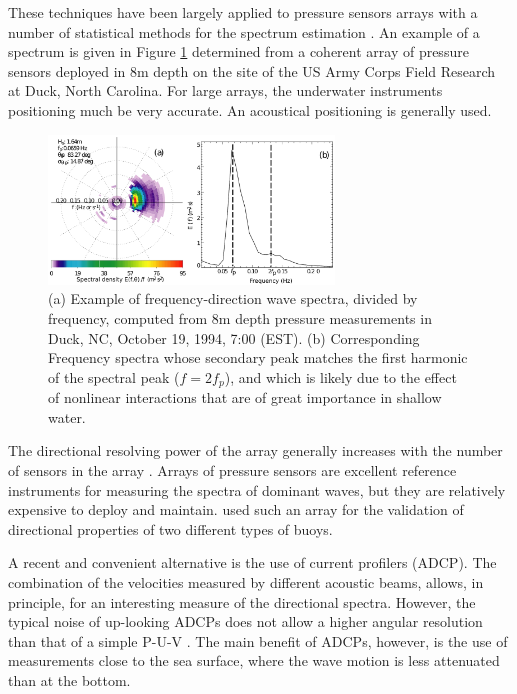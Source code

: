 These techniques have been largely applied to pressure sensors arrays with a number of statistical methods for the spectrum estimation 
 \citep[e.g.][]{Davis&Regier1977, Long&Hasselmann1979, Pawka1983, Herbers&Guza1990}. An example of a spectrum is given in Figure \ref{wave spectra} 
determined from a coherent array of pressure sensors deployed in 8m depth on the site of the US Army Corps Field Research at Duck, North Carolina. 
For large arrays, the underwater instruments positioning much be very accurate. An acoustical positioning is generally used.
\begin{figure}
\centerline{\includegraphics[width=0.6758\textwidth]{FIGS_CH_MEASUREMENTS/introduction_fig1.pdf}}
\caption{(a) Example of frequency-direction wave spectra, divided by frequency, computed from 8m depth pressure measurements in Duck, NC, October 
19, 1994, 7:00 (EST). (b) Corresponding Frequency spectra whose secondary peak matches the first harmonic of the spectral peak 
($f=2f_p$), and which is likely due to the effect of nonlinear interactions that are of great importance in shallow water.}
\label{wave spectra}
\end{figure}
  The directional resolving power of the array generally increases with the number of sensors in the array \citep[see][]{Kinsman1965}. 
  Arrays of pressure sensors are excellent reference instruments for measuring the spectra of dominant waves,  but they 
are relatively expensive to deploy and maintain. \cite{OReilly&al.1996} used such an array for the validation of directional properties of two different types of 
buoys. %

A recent and convenient alternative is the use of current profilers (ADCP).  The combination of the velocities measured by different acoustic beams, 
allows, in principle, for an interesting measure of the directional spectra. However, the typical noise of up-looking ADCPs does not allow a 
higher angular resolution than that of a simple P-U-V \citep{Herbers&Lentz2010}. The main benefit of ADCPs, however, is the use of measurements close to the sea surface, 
where the wave motion is less attenuated than at the bottom. 

